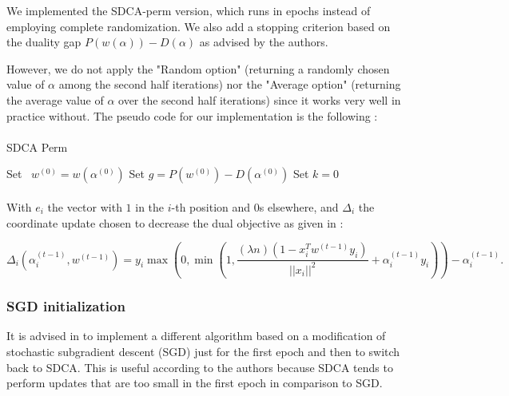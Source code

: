 \documentclass[10pt,a4paper]{article}
\begin{document}
We implemented the SDCA-perm version, which runs in epochs instead of employing complete randomization. We also add a stopping criterion based on the duality gap $P(w(\alpha)) - D(\alpha)$ as advised by the authors. 


However, we do not apply the "Random option" (returning a randomly chosen value of $\alpha$ among the second half iterations) nor the "Average option" (returning the average value of $\alpha$ over the second half iterations) since it works very well in practice without. The pseudo code for our implementation is the following : 

\paragraph{}
\begin{algorithm}[H]
\caption{SDCA Perm}
\SetAlgoLined
{}
Set ~$w^{(0)} = w(\alpha^{(0)})$\;
Set $g= P(w^{(0)} ) - D(\alpha^{(0)})$\;
Set $k = 0$\;

\end{algorithm}

\paragraph{}
With $e_i$ the vector with $1$ in the $i$-th position and $0$s elsewhere, and $\Delta_i$ the coordinate update chosen to decrease the dual objective as given in \cite{1}:

$$\Delta_i (\alpha_i^{(t-1)}, w^{(t-1)}) = y_i \max \left ( 0, \min \left ( 1, \frac{(\lambda n) (1 - x_i^Tw^{(t-1)}y_i)}{||x_i||^2} + \alpha_i^{(t-1)}y_i \right ) \right ) - \alpha_i^{(t-1)}.$$


\subsubsection{SGD initialization}

It is advised in \cite{1} to implement a different algorithm based on a modification of stochastic subgradient descent (SGD) just for the first epoch and then to switch back to SDCA. This is useful according to the authors because SDCA tends to perform updates that are too small in the first epoch in comparison to SGD. 
\end{document}
